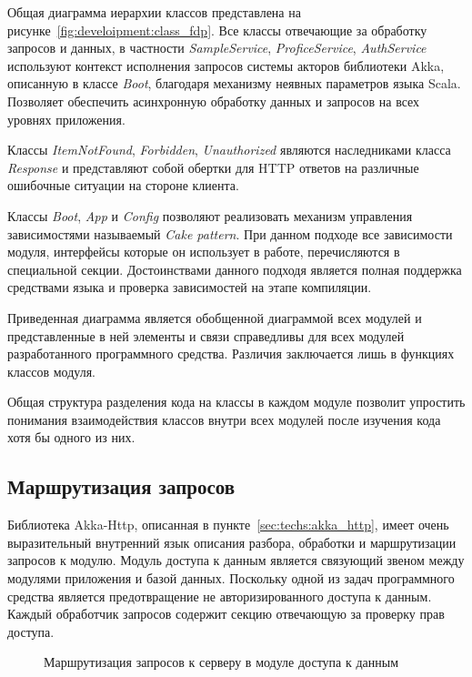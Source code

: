 Общая диаграмма иерархии классов представлена на рисунке~\ref{fig:develoipment:class_fdp}. Все классы отвечающие за обработку запросов и данных, в частности \emph{SampleService}, \emph{ProficeService}, \emph{AuthService} используют контекст исполнения запросов системы акторов библиотеки Akka, описанную в классе \emph{Boot}, благодаря механизму неявных параметров языка Scala. Позволяет обеспечить асинхронную обработку данных и запросов на всех уровнях приложения.

Классы \emph{ItemNotFound}, \emph{Forbidden}, \emph{Unauthorized} являются наследниками класса \emph{Response} и представляют собой обертки для HTTP ответов на различные ошибочные ситуации на стороне клиента.

Классы \emph{Boot}, \emph{App} и \emph{Config} позволяют реализовать механизм управления зависимостями называемый \emph{Cake pattern}. При данном подходе все зависимости модуля, интерфейсы которые он использует в работе, перечисляются в специальной секции. Достоинствами данного подходя является полная поддержка средствами языка и проверка зависимостей на этапе компиляции.

Приведенная диаграмма является обобщенной диаграммой всех модулей и представленные в ней элементы и связи справедливы для всех модулей разработанного программного средства. Различия заключается лишь в функциях классов модуля.

Общая структура разделения кода на классы в каждом модуле позволит упростить понимания взаимодействия классов внутри всех модулей после изучения кода хотя бы одного из них.

\subsection{Маршрутизация запросов}
Библиотека Akka-Http, описанная в пункте~\ref{sec:techs:akka_http}, имеет очень выразительный внутренний язык описания разбора, обработки и маршрутизации запросов к модулю. Модуль доступа к данным является связующий звеном между модулями приложения и базой данных. Поскольку одной из задач программного средства является предотвращение не авторизированного доступа к данным. Каждый обработчик запросов содержит секцию отвечающую за проверку прав доступа.
\begin{figure}[h]
    \centering
    
    \caption{Маршрутизация запросов к серверу в модуле доступа к данным}
    \label{listing:development:db_rout}
\end{figure}

